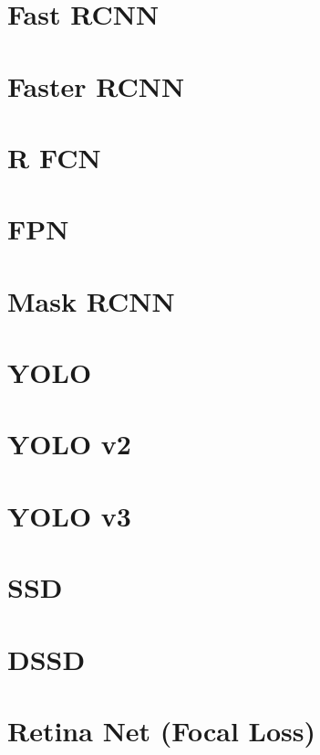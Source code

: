 \section{Fast RCNN}

\section{Faster RCNN}

\section{R FCN}


\section{FPN}


\section{Mask RCNN}


\section{YOLO}


\section{YOLO v2}


\section{YOLO v3}


\section{SSD}


\section{DSSD}


\section{Retina Net (Focal Loss)}

